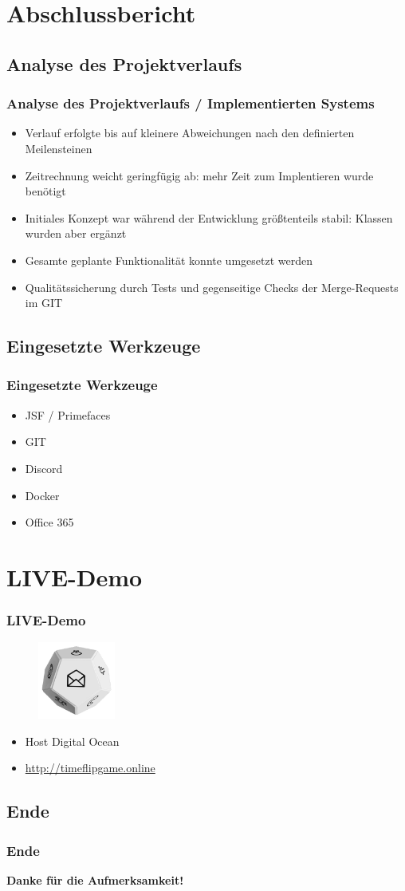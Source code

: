 \documentclass[hyperref={pdfpagelabels=false}, xcolor=dvipsnames]{beamer}
\begin{document}
\section{Abschlussbericht}
\subsection{Analyse des Projektverlaufs}
\begin{frame}
\frametitle{Analyse des Projektverlaufs / Implementierten Systems}
\begin{itemize}
  \item Verlauf erfolgte bis auf kleinere Abweichungen nach den definierten Meilensteinen
  \item Zeitrechnung weicht geringfügig ab: mehr Zeit zum Implentieren wurde benötigt
  \item Initiales Konzept war während der Entwicklung größtenteils stabil: Klassen wurden aber ergänzt
  \item Gesamte geplante Funktionalität konnte umgesetzt werden
  \item Qualitätssicherung durch Tests und gegenseitige Checks der Merge-Requests im GIT 
\end{itemize}
\end{frame}

\subsection{Eingesetzte Werkzeuge}
\begin{frame}
\frametitle{Eingesetzte Werkzeuge}
\begin{itemize}
  \item JSF / Primefaces
  \item GIT
  \item Discord
  \item Docker
  \item Office 365
\end{itemize}
\end{frame}

\section{LIVE-Demo}
\begin{frame}
\frametitle{LIVE-Demo}
\begin{figure}[H]\centering
  \includegraphics[height=1in]{logo.jpg}
\end{figure}

\begin{itemize}
  \item Host Digital Ocean
  \item \url{http://timeflipgame.online}
\end{itemize}
\end{frame}

\subsection{Ende}
\begin{frame}
\frametitle{Ende}
\centering
\textbf{Danke für die Aufmerksamkeit!}
\end{frame}
\end{document}
